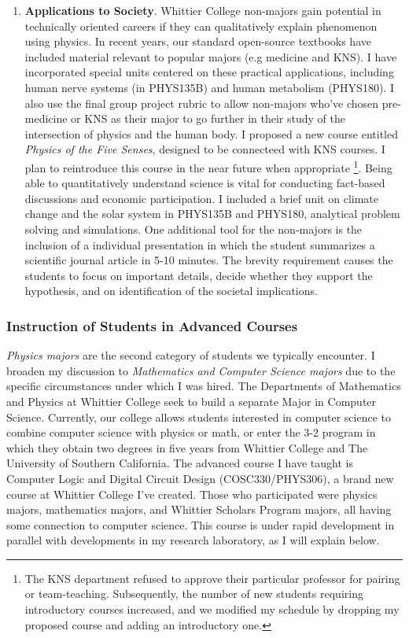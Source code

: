 \documentclass[../../main.tex]{subfiles}
\begin{document}
\begin{enumerate}
\item \textbf{Applications to Society}. Whittier College non-majors gain potential in technically oriented careers if they can qualitatively explain phenomenon using physics.  In recent years, our standard open-source textbooks have included material relevant to popular majors (e.g medicine and KNS). I have incorporated special units centered on these practical applications, including human nerve systems (in PHYS135B) and human metabolism (PHYS180).  I also use the final group project rubric to allow non-majors who've chosen pre-medicine or KNS as their major to go further in their study of the intersection of physics and the human body.  I proposed a new course entitled \textit{Physics of the Five Senses}, designed to be connecteed with KNS courses.  I plan to reintroduce this course in the near future when appropriate \footnote{The KNS department refused to approve their particular professor for pairing or team-teaching.  Subsequently, the number of new students requiring introductory courses increased, and we modified my schedule by dropping my proposed course and adding an introductory one.}. Being able to quantitatively understand science is vital for conducting fact-based discussions and economic participation.  I included a brief unit on climate change and the solar system in PHYS135B and PHYS180, analytical problem solving and simulations.  One additional tool for the non-majors is the inclusion of a individual presentation in which the student summarizes a scientific journal article in 5-10 minutes.  The brevity requirement causes the students to focus on important details, decide whether they support the hypothesis, and on identification of the societal implications.
\end{enumerate}

\subsubsection{Instruction of Students in Advanced Courses}

\textit{Physics majors} are the second category of students we typically encounter.  I broaden my discussion to \textit{Mathematics and Computer Science majors} due to the specific circumstances under which I was hired.  The Departments of Mathematics and Physics at Whittier College seek to build a separate Major in Computer Science.  Currently, our college allows students interested in computer science to combine computer science with physics or math, or enter the 3-2 program in which they obtain two degrees in five years from Whittier College and The University of Southern California.  The advanced course I have taught is Computer Logic and Digital Circuit Design (COSC330/PHYS306), a brand new course at Whittier College I've created.  Those who participated were physics majors, mathematics majors, and Whittier Scholars Program majors, all having some connection to computer science.  This course is under rapid development in parallel with developments in my research laboratory, as I will explain below. \\ \hspace{0.1cm}
\end{document}
